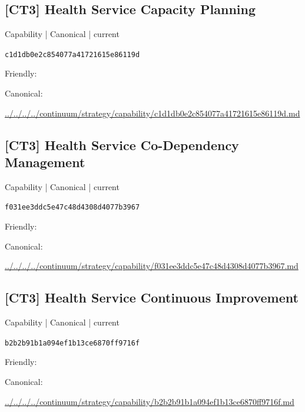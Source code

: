 \documentclass[10pt,a4paper]{article}
\begin{document}
\subsection*{[CT3] Health Service Capacity Planning}
{\small Capability | Canonical | current}\par
\texttt{c1d1db0e2c854077a41721615e86119d}\par
Friendly: \par
Canonical: \par
{\footnotesize\url{../../../../continuum/strategy/capability/c1d1db0e2c854077a41721615e86119d.md}}\par
\subsection*{[CT3] Health Service Co-Dependency Management}
{\small Capability | Canonical | current}\par
\texttt{f031ee3ddc5e47c48d4308d4077b3967}\par
Friendly: \par
Canonical: \par
{\footnotesize\url{../../../../continuum/strategy/capability/f031ee3ddc5e47c48d4308d4077b3967.md}}\par
\subsection*{[CT3] Health Service Continuous Improvement}
{\small Capability | Canonical | current}\par
\texttt{b2b2b91b1a094ef1b13ce6870ff9716f}\par
Friendly: \par
Canonical: \par
{\footnotesize\url{../../../../continuum/strategy/capability/b2b2b91b1a094ef1b13ce6870ff9716f.md}}\par
\end{document}
